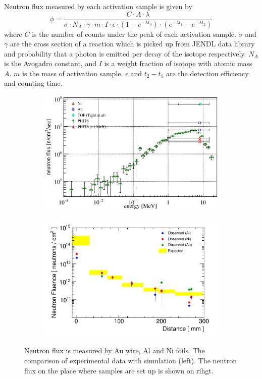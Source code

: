 Neutron flux measured by each activation sample is given by~\cite{nicholas}
\begin{equation}
 \phi = \frac{C \cdot A \cdot \lambda}{\sigma \cdot N_A \cdot \gamma \cdot m \cdot I \cdot \epsilon \cdot (1 - e^{-\lambda t_0}) \cdot (e^{-\lambda t_1} - e^{-\lambda t_2})}
\end{equation}
where $C$ is the number of counts under the peak of each activation sample.
$\sigma$ and $\gamma$ are the cross section of a reaction which is picked up from JENDL data library and probability that a photon is emitted per decay of the isotope respectively.
$N_A$ is the Avogadro constant, and $I$ is a weight fraction of isotope with atomic mass $A$.
$m$ is the mass of activation sample.
$\epsilon$ and $t_2-t_1$ are the detection efficiency and counting time.
  \begin{figure}[H]
   \begin{subfigure}{0.3\textwidth}
   \centering
   \includegraphics[scale=0.45]{chapter4/fig/flux}
   \end{subfigure}
   \hspace{0.2\textwidth}
   \begin{subfigure}{0.3\textwidth}
   \centering
   \includegraphics[scale=0.48]{chapter4/fig/fluxtot.pdf}
   \end{subfigure}
   \caption{Neutron flux is measured by Au wire, Al and Ni foils. The comparison of experimental data with simulation (left). The neutron flux on the place where samples are set up is shown on rihgt.}
   \label{3flux}
  \end{figure}
